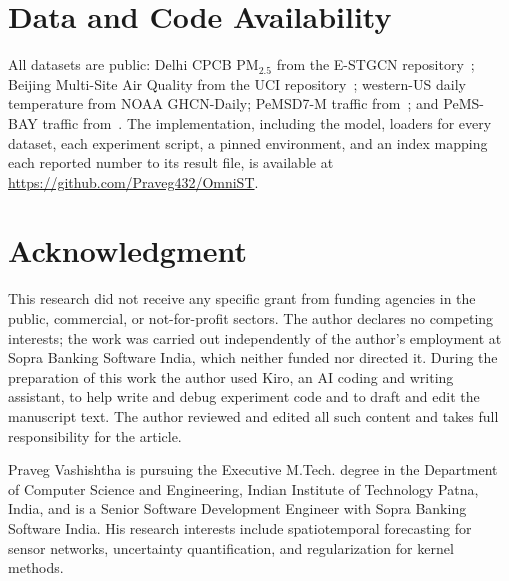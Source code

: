 \documentclass[journal]{IEEEtran}
\newcommand{\repourl}{https://github.com/Praveg432/OmniST}
\begin{document}
\section*{Data and Code Availability}
All datasets are public: Delhi CPCB PM$_{2.5}$ from the E-STGCN repository~\cite{panja2026estgcn};
Beijing Multi-Site Air Quality from the UCI repository~\cite{zhang2017beijingair}; western-US daily
temperature from NOAA GHCN-Daily; PeMSD7-M traffic from~\cite{yu2018stgcn}; and PeMS-BAY traffic
from~\cite{li2018dcrnn}. The implementation, including the model, loaders for every dataset, each
experiment script, a pinned environment, and an index mapping each reported number to its result
file, is available at \url{\repourl}.

\section*{Acknowledgment}
This research did not receive any specific grant from funding agencies in the public, commercial, or
not-for-profit sectors. The author declares no competing interests; the work was carried out
independently of the author's employment at Sopra Banking Software India, which neither funded nor
directed it. During the preparation of this work the author used Kiro, an AI coding and writing
assistant, to help write and debug experiment code and to draft and edit the manuscript text. The
author reviewed and edited all such content and takes full responsibility for the article.




\begin{IEEEbiographynophoto}{Praveg Vashishtha}
is pursuing the Executive M.Tech. degree in the Department of Computer Science and Engineering,
Indian Institute of Technology Patna, India, and is a Senior Software Development Engineer with Sopra
Banking Software India. His research interests include spatiotemporal forecasting for sensor
networks, uncertainty quantification, and regularization for kernel methods.
\end{IEEEbiographynophoto}
\end{document}
